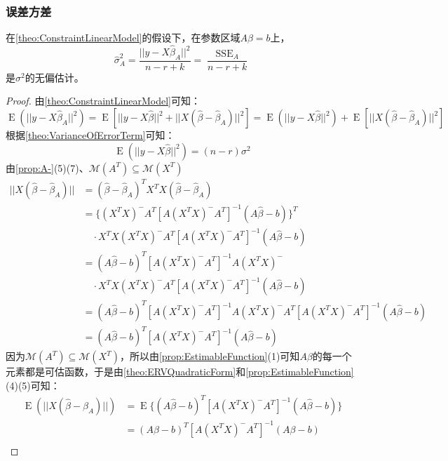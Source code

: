 \subsubsection{误差方差}
\begin{theorem}
	在\cref{theo:ConstraintLinearModel}的假设下，在参数区域$A\beta=b$上，
	\begin{equation*}
		\hat{\sigma}_A^2=\frac{||y-X\hat{\beta}_A||^2}{n-r+k}=\frac{\operatorname{SSE}_A}{n-r+k}
	\end{equation*}
	是$\sigma^2$的无偏估计。
\end{theorem}
\begin{proof}
	由\cref{theo:ConstraintLinearModel}可知：
	\begin{equation*}
		\operatorname{E}(||y-X\hat{\beta}_A||^2)=\operatorname{E}[||y-X\hat{\beta}||^2+||X(\hat{\beta}-\hat{\beta}_A)||^2]=\operatorname{E}(||y-X\hat{\beta}||^2)+\operatorname{E}[||X(\hat{\beta}-\hat{\beta}_A)||^2]
	\end{equation*}
	根据\cref{theo:VarianceOfErrorTerm}可知：
	\begin{equation*}
		\operatorname{E}(||y-X\hat{\beta}||^2)=(n-r)\sigma^2
	\end{equation*}
	由\cref{prop:A-}(5)(7)、$\mathcal{M}(A^T)\subseteq\mathcal{M}(X^T)$
	\begin{align*}
		||X(\hat{\beta}-\hat{\beta}_A)||&=(\hat{\beta}-\hat{\beta}_A)^TX^TX(\hat{\beta}-\hat{\beta}_A) \\
		&=\{(X^TX)^-A^T[A(X^TX)^-A^T]^{-1}(A\hat{\beta}-b)\}^T \\
		&\quad\cdot X^TX(X^TX)^-A^T[A(X^TX)^-A^T]^{-1}(A\hat{\beta}-b) \\
		&=(A\hat{\beta}-b)^T[A(X^TX)^-A^T]^{-1}A(X^TX)^- \\
		&\quad\cdot X^TX(X^TX)^-A^T[A(X^TX)^-A^T]^{-1}(A\hat{\beta}-b) \\
		&=(A\hat{\beta}-b)^T[A(X^TX)^-A^T]^{-1}A(X^TX)^-A^T[A(X^TX)^-A^T]^{-1}(A\hat{\beta}-b) \\
		&=(A\hat{\beta}-b)^T[A(X^TX)^-A^T]^{-1}(A\hat{\beta}-b)
	\end{align*}
	因为$\mathcal{M}(A^T)\subseteq\mathcal{M}(X^T)$，所以由\cref{prop:EstimableFunction}(1)可知$A\beta$的每一个元素都是可估函数，于是由\cref{theo:ERVQuadraticForm}和\cref{prop:EstimableFunction}(4)(5)可知：
	\begin{align*}
		\operatorname{E}(||X(\hat{\beta}-\hat{\beta}_A)||)
		&=\operatorname{E}\{(A\hat{\beta}-b)^T[A(X^TX)^-A^T]^{-1}(A\hat{\beta}-b)\} \\
		&=(A\beta-b)^T[A(X^TX)^-A^T]^{-1}(A\beta-b) \\

\end{align*}
\end{proof}
